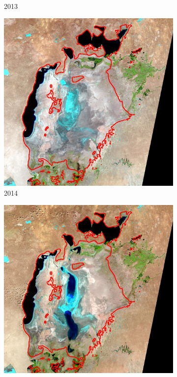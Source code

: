 \documentclass[12pt,a4paper]{article}
\begin{document}
\begin{figure}[H]
\begin{subfigure}[b]{0.19\textwidth}
        \caption{2013}
    \end{subfigure}
    \begin{subfigure}[b]{0.19\textwidth}
        \centering
        \includegraphics[width=\textwidth]{../img/2014o.jpg}
        \caption{2014}
    \end{subfigure}
    \begin{subfigure}[b]{0.19\textwidth}
        \centering
        \includegraphics[width=\textwidth]{../img/2015o.jpg}

\end{subfigure}
\end{figure}
\end{document}
